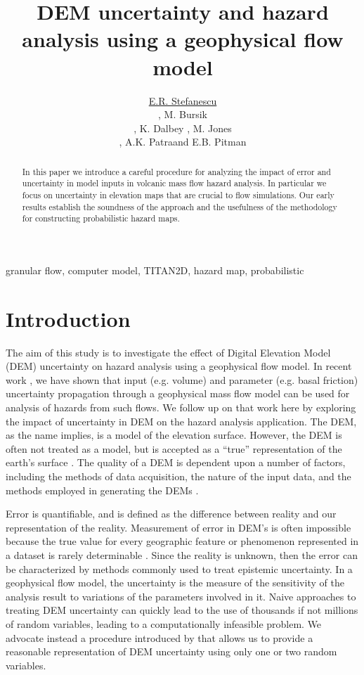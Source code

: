 \documentclass[a4paper,fleqn]{article}
\title{DEM uncertainty and hazard analysis using a geophysical flow model}
\author{\underline{E.R. Stefanescu} \address[A1]{\it{Department of
Mechanical \& Aerospace Engineering, University at Buffalo, SUNY,
Buffalo,NY 14260 , (ers32@buffalo.edu, abani@buffalo.edu)}}, M.
Bursik\address[B1]{\it{Dept. of Geology, University at Buffalo, SUNY,
Buffalo,NY 14260 , (mib@buffalo.edu)}}, K. Dalbey \addressmark[A1],
M. Jones \address[C1] {\it {Center for Computational
Research,University at Buffalo, SUNY, Buffalo,NY 14260}}, A.K.
Patra\addressmark[A1] and E.B. Pitman\addressmark[A1] }
\begin{document}
\begin{abstract}
In this paper we introduce a careful procedure for analyzing the impact of 
error and uncertainty in model inputs in volcanic mass flow hazard analysis.
In particular we focus on uncertainty in elevation maps that are
crucial to flow simulations. Our early results establish the soundness
of the approach and the usefulness of the methodology for constructing
probabilistic hazard maps.
\end{abstract}
\begin{keyword}
  granular flow, computer model, TITAN2D, hazard map, probabilistic
\end{keyword}

\maketitle


\section{Introduction}

The aim of this study is to investigate the effect of Digital Elevation Model (DEM) uncertainty
on hazard analysis using a geophysical flow model.  In recent work
\citep{dalbeyjgr,dalbeythesis}, we have shown that input (e.g. volume)
and parameter (e.g. basal friction) uncertainty propagation through a
geophysical mass flow model can be used for analysis of hazards from
such flows. We follow up on that work here by exploring the impact of
uncertainty in DEM on the hazard analysis
application. The DEM, as the name implies, is a model of the elevation
surface. However, the DEM is often not treated as a model, but is
accepted as a ``true'' representation of the earth's surface
\citep{Suzanne_Wechsler}. The quality of a DEM is dependent upon a
number of factors, including the methods of data acquisition, the
nature of the input data, and the methods employed in generating the
DEMs \citep{Shearer_1990}.

Error is quantifiable, and is defined as the difference between
reality and our representation of the reality. Measurement of error
in DEM's is often impossible because the true value for every
geographic feature or phenomenon represented in a dataset is rarely
determinable \citep{Goodchild_1994, Hunter_1995}. Since the reality is
unknown, then the error can be characterized by methods commonly used
to treat epistemic uncertainty. In a geophysical flow model, the
uncertainty is the measure of the sensitivity of the analysis result
to variations of the parameters involved in it. Naive approaches to
treating DEM uncertainty can quickly lead to the use of thousands if
not millions of random variables, leading to a computationally
infeasible problem. We advocate instead a procedure introduced by
\citep{Goodchild_1994, Hunter_1995} that allows us to provide a
reasonable representation of DEM uncertainty using only one or two
random variables.
\end{document}
